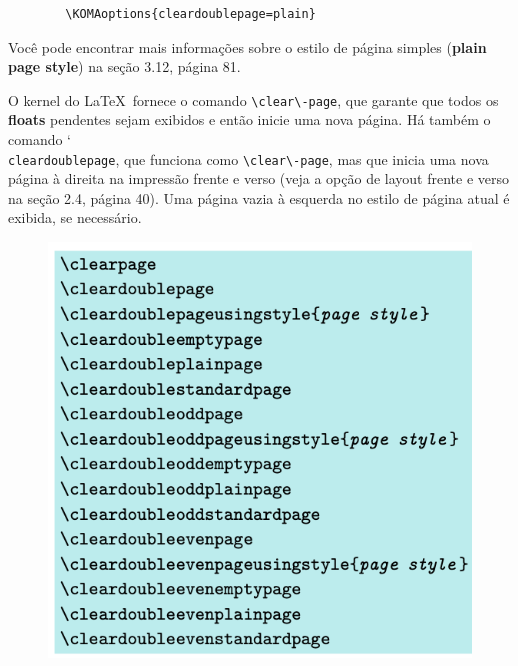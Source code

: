 \begin{verbatim}
        \KOMAoptions{cleardoublepage=plain}
\end{verbatim}

Você pode encontrar mais informações sobre o estilo de página simples (\textbf{plain page style}) na seção 3.12, página 81.

O kernel do \LaTeX\ fornece o comando \verb|\clear\-page|, que garante que todos os \textbf{floats} pendentes sejam exibidos e então inicie uma nova página. Há também o comando \char`\\\texttt{clear\-dou\-ble\-pa\-ge}, que funciona como \verb|\clear\-page|, mas que inicia uma nova página à direita na impressão frente e verso (veja a opção de layout frente e verso na seção 2.4, página 40). Uma página vazia à esquerda no estilo de página atual é exibida, se necessário.

\begin{figure}[hb]
    \centering
    \includegraphics[width=0.75\linewidth]{imagens/imagem16.png}
    \label{fig:img16}
\end{figure}


    
